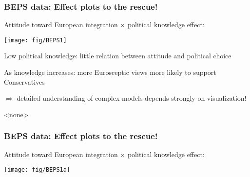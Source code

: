 \begin{frame}
 \frametitle{BEPS data: Effect plots to the rescue!}
 Attitude toward European integration $\times$ political knowledge effect:
 \begin{center}
 	 \texttt{[image: fig/BEPS1]}
 \end{center}
 \begin{itemize*}
  \item Low political knowledge: little relation between attitude and political choice
  \item As knowledge increases: more Eurosceptic views more likely to support Conservatives 
  \item $\Rightarrow$ detailed understanding of complex models depends strongly on 
   visualization!
 \end{itemize*}

\end{frame}

\begin{frame}<none>
 \frametitle{BEPS data: Effect plots to the rescue!}
 Attitude toward European integration $\times$ political knowledge effect:
 \begin{center}
 	 \texttt{[image: fig/BEPS1a]}
 \end{center}
\end{frame}
